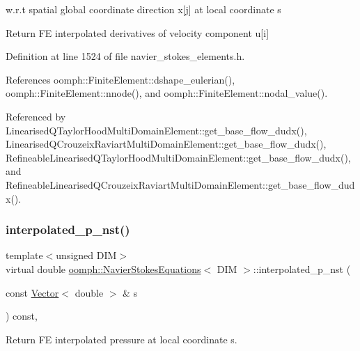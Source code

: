 w.\+r.\+t spatial global coordinate direction x\mbox{[}j\mbox{]} at local coordinate s 

Return FE interpolated derivatives of velocity component u\mbox{[}i\mbox{]} 

Definition at line 1524 of file navier\+\_\+stokes\+\_\+elements.\+h.



References oomph\+::\+Finite\+Element\+::dshape\+\_\+eulerian(), oomph\+::\+Finite\+Element\+::nnode(), and oomph\+::\+Finite\+Element\+::nodal\+\_\+value().



Referenced by Linearised\+Q\+Taylor\+Hood\+Multi\+Domain\+Element\+::get\+\_\+base\+\_\+flow\+\_\+dudx(), Linearised\+Q\+Crouzeix\+Raviart\+Multi\+Domain\+Element\+::get\+\_\+base\+\_\+flow\+\_\+dudx(), Refineable\+Linearised\+Q\+Taylor\+Hood\+Multi\+Domain\+Element\+::get\+\_\+base\+\_\+flow\+\_\+dudx(), and Refineable\+Linearised\+Q\+Crouzeix\+Raviart\+Multi\+Domain\+Element\+::get\+\_\+base\+\_\+flow\+\_\+dudx().

\mbox{\label{classoomph_1_1NavierStokesEquations_aaffc8d182f6bdf382ccbdf54cf3c4e55}} 
\subsubsection{\texorpdfstring{interpolated\+\_\+p\+\_\+nst()}{interpolated\_p\_nst()}\hspace{0.1cm}{\footnotesize\ttfamily [1/2]}}
{\footnotesize\ttfamily template$<$unsigned D\+IM$>$ \\
virtual double \hyperlink{classoomph_1_1NavierStokesEquations}{oomph\+::\+Navier\+Stokes\+Equations}$<$ D\+IM $>$\+::interpolated\+\_\+p\+\_\+nst (\begin{DoxyParamCaption}\item[{const \hyperlink{classoomph_1_1Vector}{Vector}$<$ double $>$ \&}]{s }\end{DoxyParamCaption}) const\hspace{0.3cm}{\ttfamily [inline]}, {\ttfamily [virtual]}}



Return FE interpolated pressure at local coordinate s. 



